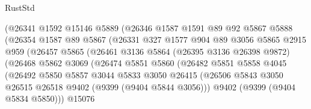 \begin{lexlean}{RustStd}
\begin{coremodule}
                          (@26341
                            @1592
                            @15146
                            @5889
                            (@26346
                              @1587
                              @1591
                              @89
                              @92
                              @5867
                              @5888
                              (@26354
                                @1587
                                @89
                                @5867
                                (@26331
                                  @327
                                  @1577
                                  @904
                                  @89
                                  @3056
                                  @5865
                                  @2915
                                  @959
                                  (@26457
                                    @5865
                                    (@26461
                                      @3136
                                      @5864
                                      (@26395 @3136 @26398 @9872)
                                      (@26468
                                        @5862
                                        @3069
                                        (@26474
                                          @5851
                                          @5860
                                          (@26482
                                            @5851
                                            @5858
                                            @4045
                                            (@26492
                                              @5850
                                              @5857
                                              @3044
                                              @5833
                                              @3050
                                              @26415
                                              (@26506
                                                @5843
                                                @3050
                                                @26515
                                                @26518
                                                @9402
                                                (@9399 (@9404 @5844 @3056)))
                                              @9402
                                              (@9399 (@9404 @5834 @5850)))
                                            @15076

\end{coremodule}
\end{lexlean}

